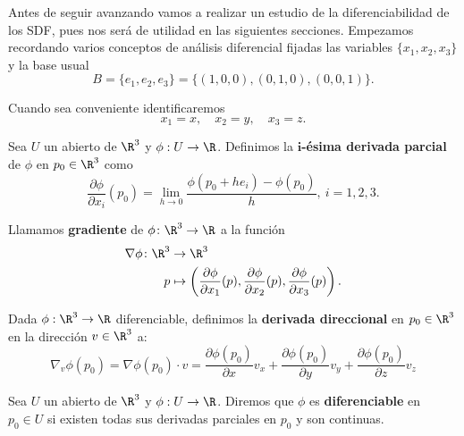 Antes de seguir avanzando vamos a realizar un estudio de la diferenciabilidad de los SDF, pues nos será de utilidad en las siguientes secciones. Empezamos recordando varios conceptos de análisis diferencial \cite{diff} fijadas las variables $\{x_1,x_2,x_3\}$ y la base usual $$B=\{e_1,e_2,e_3\} = \{(1,0,0),(0,1,0),(0,0,1)\}.$$

Cuando sea conveniente identificaremos
\begin{equation*}
    x_1=x,\quad x_2=y,\quad x_3 = z.
\end{equation*}

\begin{definicion}
    Sea $U$ un abierto de $\R^3$ y $\phi: U \to \R$. Definimos la \textbf{$\boldsymbol{i}$-ésima derivada parcial} de $\phi$ en $p_0\in\R^3$ como
    \begin{equation*}
        \frac{\partial \phi}{\partial x_i}(p_0) = \lim_{h\to 0}\frac{\phi(p_0+he_i) - \phi(p_0)}{h},\ i=1,2,3.
    \end{equation*}
\end{definicion}

\begin{definicion}
  Llamamos \textbf{gradiente} de $\phi\colon \R^3\to\R$ a la función
  \begin{align*}
      \nabla\phi\colon \R^3 &\to \R^3\\
      p &\mapsto \left(\frac{\partial \phi}{\partial x_1}(p), \frac{\partial \phi}{\partial x_2}(p), \frac{\partial \phi}{\partial x_3}(p)\right).
  \end{align*}
\end{definicion}

\begin{definicion}
  Dada $\phi:\R^3\to \R$ diferenciable, definimos la \textbf{derivada direccional} en $p_0\in \R^3$ en la dirección $v\in\R^3$ a:
  \begin{equation*}
    \nabla_v \phi(p_0) = \nabla \phi(p_0) \cdot v = \frac{\partial{\phi}(p_0)}{\partial{x}}v_x + \frac{\partial{\phi}(p_0)}{\partial{y}}v_y + \frac{\partial{\phi}(p_0)}{\partial{z}}v_z
  \end{equation*}
\end{definicion}

\begin{definicion}
    Sea $U$ un abierto de $\R^3$ y $\phi: U \to \R$. Diremos que $\phi$ es \textbf{diferenciable} en $p_0 \in U$ si existen todas sus derivadas parciales en $p_0$ y son continuas.
\end{definicion}


